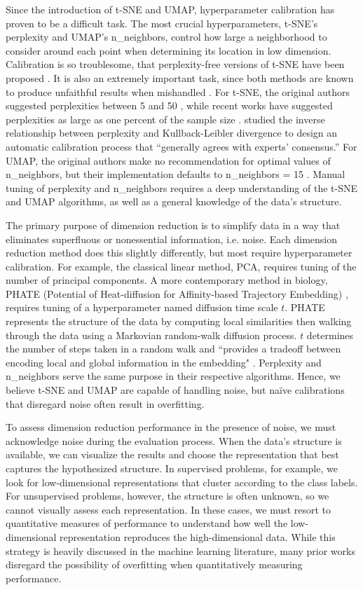 \documentclass{article}
\begin{document}
Since the introduction of t-SNE and UMAP, hyperparameter calibration has proven to be a difficult task. The most crucial hyperparameters, t-SNE's perplexity and UMAP's n\_neighbors, control how large a neighborhood to consider around each point when determining its location in low dimension. Calibration is so troublesome, that perplexity-free versions of t-SNE have been proposed \cite{perplexity-free t-SNE}. It is also an extremely important task, since both methods are known to produce unfaithful results when mishandled \cite{evaluation of DR transcriptomics}. For t-SNE, the original authors suggested perplexities between 5 and 50 \cite{t-SNE}, while recent works have suggested perplexities as large as one percent of the sample size \cite{t-SNE cell}. \cite{perplexity vs kl} studied the inverse relationship between perplexity and Kullback-Leibler divergence to design an automatic calibration process that ``generally agrees with experts' consensus.'' For UMAP, the original authors make no recommendation for optimal values of n\_neighbors, but their implementation defaults to n\_neighbors = 15 \cite{umap}. Manual tuning of perplexity and n\_neighbors requires a deep understanding of the t-SNE and UMAP algorithms, as well as a general knowledge of the data's structure.

The primary purpose of dimension reduction is to simplify data in a way that eliminates superfluous or nonessential information, i.e. noise. Each dimension reduction method does this slightly differently, but most require hyperparameter calibration. For example, the classical linear method, PCA, requires tuning of the number of principal components. A more contemporary method in biology, PHATE (Potential of Heat-diffusion for Affinity-based Trajectory Embedding) \cite{PHATE}, requires tuning of a hyperparameter named diffusion time scale $t$. PHATE represents the structure of the data by computing local similarities then walking through the data using a Markovian random-walk diffusion process. $t$ determines the number of steps taken in a random walk and ``provides a tradeoff between encoding local and global information in the embedding" \cite{PHATE}. Perplexity and n\_neighbors serve the same purpose in their respective algorithms. Hence, we believe t-SNE and UMAP are capable of handling noise, but na\"ive calibrations that disregard noise often result in overfitting.

To assess dimension reduction performance in the presence of noise, we must acknowledge noise during the evaluation process. When the data's structure is available, we can visualize the results and choose the representation that best captures the hypothesized structure. In supervised problems, for example, we look for low-dimensional representations that cluster according to the class labels. For unsupervised problems, however, the structure is often unknown, so we cannot visually assess each representation. In these cases, we must resort to quantitative measures of performance to understand how well the low-dimensional representation reproduces the high-dimensional data. While this strategy is heavily discussed in the machine learning literature, many prior works disregard the possibility of overfitting when quantitatively measuring performance.
\end{document}
